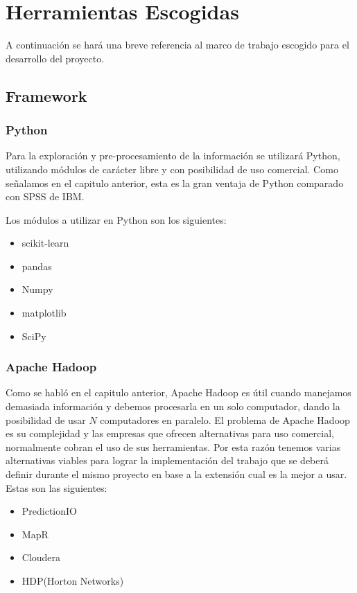 \section{Herramientas Escogidas}
A continuación se hará una breve referencia al marco de trabajo escogido para el desarrollo del proyecto.
\subsection{Framework}
\subsubsection{Python}
Para la exploración y pre-procesamiento de la información se utilizará Python, utilizando módulos de carácter libre y con posibilidad de uso comercial. Como señalamos en el capitulo anterior, esta es la gran ventaja de Python comparado con SPSS de IBM.

Los módulos a utilizar en Python son los siguientes:
\begin{itemize}
\item scikit-learn
\item pandas
\item Numpy
\item matplotlib
\item SciPy
\end{itemize}

\subsubsection{Apache Hadoop}
Como se habló en el capitulo anterior, Apache Hadoop es útil cuando manejamos demasiada información y debemos procesarla en un solo computador, dando la posibilidad de usar $N$ computadores en paralelo. El problema de Apache Hadoop es su complejidad y las empresas que ofrecen alternativas para uso comercial, normalmente cobran el uso de sus herramientas. Por esta razón tenemos varias alternativas viables para lograr la implementación del trabajo que se deberá definir durante el mismo proyecto en base a la extensión cual es la mejor a usar. Estas son las siguientes:
\begin{itemize}
\item PredictionIO
\item MapR
\item Cloudera
\item HDP(Horton Networks)
\end{itemize}